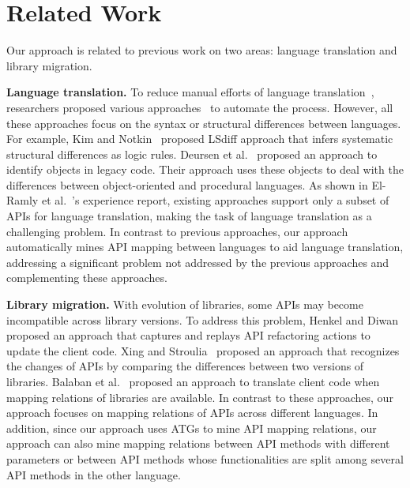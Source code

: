\section{Related Work}
\label{sec:related}

Our approach is related to previous work on two areas:
language translation and library migration.

\textbf{Language translation.} To reduce manual efforts of language
translation~\cite{samet1981experience}, researchers proposed various
approaches~\cite{hassan2005lightweight,van1999identifying,waters1988program,mossienko2003automated,yasumatsu1995spice, kim2009discovering} to automate the process.
However, all these approaches focus on the syntax or structural differences between
languages. For example, Kim and Notkin~\cite{kim2009discovering} proposed LSdiff
approach that infers systematic structural differences as logic rules.
Deursen et al.~\cite{van1999identifying} proposed an approach to identify
objects in legacy code. Their approach uses these objects to deal with the
differences between object-oriented and procedural languages. As
shown in El-Ramly et al.~\cite{el2006experiment}'s experience
report, existing approaches support only a subset of APIs for language translation,
making the task of language translation as a challenging problem.
In contrast to previous approaches, our approach automatically mines API mapping between
languages to aid language translation, addressing a significant
problem not addressed by the previous approaches and complementing
these approaches.

\textbf{Library migration.} With evolution of libraries, some APIs
may become incompatible across library versions. To address this
problem, Henkel and Diwan~\cite{henkel2005catchup} proposed an approach that captures
and replays API refactoring actions to update the client code.
Xing and Stroulia~\cite{xing2007api} proposed an approach that
recognizes the changes of APIs by comparing the differences between two
versions of libraries. Balaban et al.~\cite{balaban2005refactoring} proposed
an approach to translate client code when mapping relations of libraries are
available. In contrast to these approaches, our approach focuses on
mapping relations of APIs across different languages. In addition, since
our approach uses ATGs to mine API mapping relations, our approach can also
mine mapping relations between API methods with different parameters or between
API methods whose functionalities are split among several API methods in the other language.

